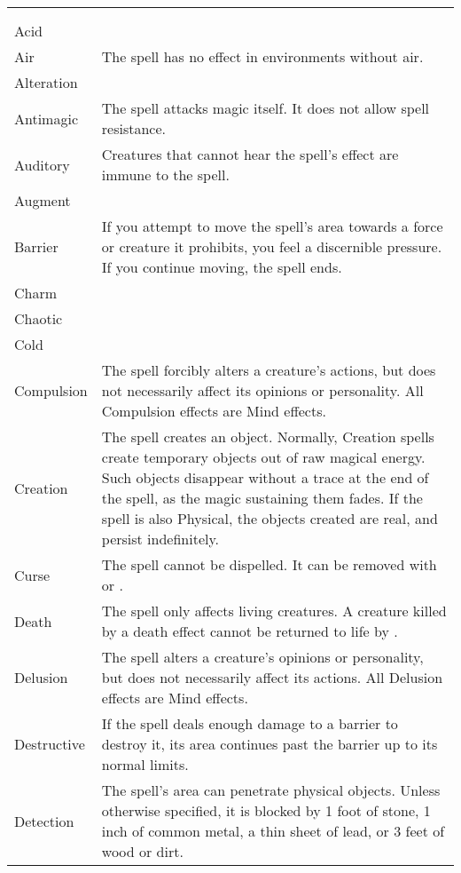{
    \onecolumn
    \begin{longtabu}{l X}
         \\
         &  \\
        Acid & \x \\
        Air & The spell has no effect in environments without air. \\
        Alteration & \x \\
        Antimagic & The spell attacks magic itself. It does not allow spell resistance. \\
        Auditory & Creatures that cannot hear the spell's effect are immune to the spell. \\
        Augment & \x \\
        Barrier & If you attempt to move the spell's area towards a force or creature it prohibits, you feel a discernible pressure. If you continue moving, the spell ends. \\
        Charm & \x \\
        Chaotic & \x \\
        Cold & \x \\
        Compulsion & The spell forcibly alters a creature's actions, but does not necessarily affect its opinions or personality. All Compulsion effects are Mind effects. \\
        Creation & The spell creates an object. Normally, Creation spells create temporary objects out of raw magical energy. Such objects disappear without a trace at the end of the spell, as the magic sustaining them fades. If the spell is also Physical, the objects created are real, and persist indefinitely.  \\
        Curse & The spell cannot be dispelled. It can be removed with  or . \\
        Death & The spell only affects living creatures. A creature killed by a death effect cannot be returned to life by . \\
        Delusion & The spell alters a creature's opinions or personality, but does not necessarily affect its actions. All Delusion effects are Mind effects. \\
        Destructive & If the spell deals enough damage to a barrier to destroy it, its area continues past the barrier up to its normal limits. \\
        Detection & The spell's area can penetrate physical objects. Unless otherwise specified, it is blocked by 1 foot of stone, 1 inch of common metal, a thin sheet of lead, or 3 feet of wood or dirt. \\

\end{longtabu}}
